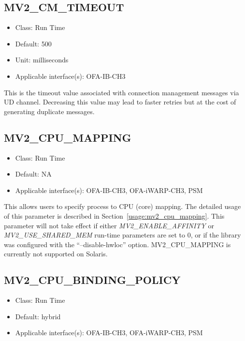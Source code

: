 \subsection{MV2\_CM\_TIMEOUT}
\label{def:mv2-cm-timeout}
\begin{itemize}
    \item Class: Run Time
    \item Default: 500
    \item Unit: milliseconds
    \item Applicable interface(s): OFA-IB-CH3
\end{itemize}
This is the timeout value associated with connection management
messages via UD channel. Decreasing this value may lead to faster
retries but at the cost of generating duplicate messages.

\subsection{MV2\_CPU\_MAPPING}
\label{def:mv2-cpu-mapping}
\begin{itemize}
    \item Class: Run Time
    \item Default: NA
    \item Applicable interface(s):  OFA-IB-CH3, OFA-iWARP-CH3, PSM
\end{itemize}

This allows users to specify process to CPU (core) mapping. The detailed usage
of this parameter is described in Section~\ref{usage:mv2_cpu_mapping}. This 
parameter will not take effect if either \textit{MV2\_ENABLE\_AFFINITY} or \textit{MV2\_USE\_SHARED\_MEM}
run-time parameters are set to 0, or
if the library was configured with the ``--disable-hwloc'' option.
MV2\_CPU\_MAPPING is currently not supported on Solaris.

\subsection{MV2\_CPU\_BINDING\_POLICY}
\label{def:mv2-cpu-binding-policy}
\begin{itemize}
    \item Class: Run Time
    \item Default: hybrid 
    \item Applicable interface(s):  OFA-IB-CH3, OFA-iWARP-CH3, PSM
\end{itemize}

